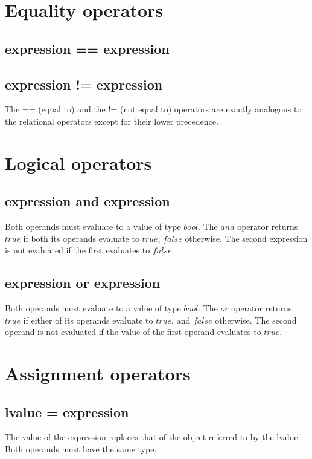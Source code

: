 \begin{homeworkProblem}
    \section{Equality operators}

    \subsection{expression == expression}
    \subsection{expression != expression}
    The == (equal to) and the != (not equal to) operators are exactly analogous to the relational operators except for their lower precedence.

    \section{Logical operators}

    \subsection{expression and expression}
    Both operands must evaluate to a value of type $bool$. The $and$ operator returns $true$ if both its operands evaluate to $true$, $false$ otherwise. The second expression is not evaluated if the first evaluates to $false$.

    \subsection{expression or expression}
    Both operands must evaluate to a value of type $bool$. The $or$ operator returns $true$ if either of its operands evaluate to $true$, and $false$ otherwise. The second operand is not evaluated if the value of the first operand evaluates to $true$.

    \section{Assignment operators}

    \subsection{lvalue = expression}
    The value of the expression replaces that of the object referred to by the lvalue. Both operands must have the same type.
    \end{homeworkProblem}
